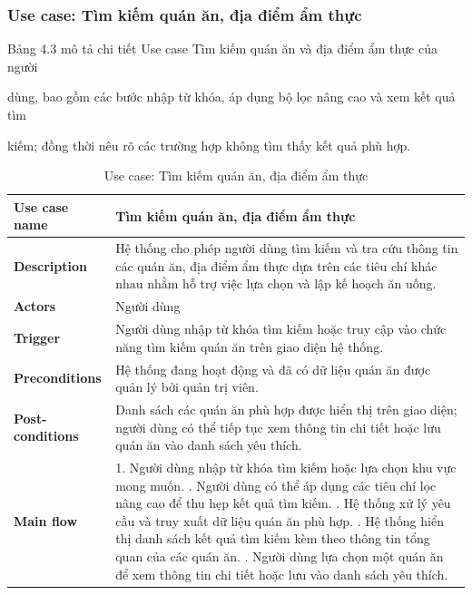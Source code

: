 

\subsubsection{Use case: Tìm kiếm quán ăn, địa điểm ẩm thực}

Bảng 4.3 mô tả chi tiết Use case Tìm kiếm quán ăn và địa điểm ẩm thực của người

dùng, bao gồm các bước nhập từ khóa, áp dụng bộ lọc nâng cao và xem kết quả tìm

kiếm; đồng thời nêu rõ các trường hợp không tìm thấy kết quả phù hợp.


\begingroup
\renewcommand{\arraystretch}{1.25}
\begin{longtable}{|p{4cm}|p{10cm}|}
\caption{Use case: Tìm kiếm quán ăn, địa điểm ẩm thực} \\
\endfirsthead

\endhead

\endfoot

\endlastfoot

\hline

\textbf{Use case name} &
Tìm kiếm quán ăn, địa điểm ẩm thực \\
\hline

\textbf{Description} &
Hệ thống cho phép người dùng tìm kiếm và tra cứu thông tin các quán ăn, địa điểm ẩm thực dựa trên các tiêu chí khác nhau nhằm hỗ trợ việc lựa chọn và lập kế hoạch ăn uống. \\
\hline

\textbf{Actors} &
Người dùng \\
\hline

\textbf{Trigger} &
Người dùng nhập từ khóa tìm kiếm hoặc truy cập vào chức năng tìm kiếm quán ăn trên giao diện hệ thống. \\
\hline

\textbf{Preconditions} &
Hệ thống đang hoạt động và đã có dữ liệu quán ăn được quản lý bởi quản trị viên. \\
\hline

\textbf{Post-conditions} &
Danh sách các quán ăn phù hợp được hiển thị trên giao diện; người dùng có thể tiếp tục xem thông tin chi tiết hoặc lưu quán ăn vào danh sách yêu thích. \\
\hline

\textbf{Main flow} &
1. Người dùng nhập từ khóa tìm kiếm hoặc lựa chọn khu vực mong muốn. \newline 2. Người dùng có thể áp dụng các tiêu chí lọc nâng cao để thu hẹp kết quả tìm kiếm. \newline 3. Hệ thống xử lý yêu cầu và truy xuất dữ liệu quán ăn phù hợp. \newline 4. Hệ thống hiển thị danh sách kết quả tìm kiếm kèm theo thông tin tổng quan của các quán ăn. \newline 5. Người dùng lựa chọn một quán ăn để xem thông tin chi tiết hoặc lưu vào danh sách yêu thích. \\
\hline


\end{longtable}
